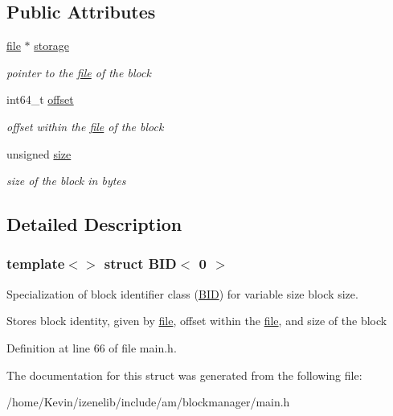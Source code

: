 \subsection*{Public Attributes}
\begin{CompactItemize}
\item 
\hypertarget{structBID_3_010_01_4_b98488cecac14193e6b1505088b2ecee}{
\hyperlink{classfile}{file} $\ast$ \hyperlink{structBID_3_010_01_4_b98488cecac14193e6b1505088b2ecee}{storage}}
\label{structBID_3_010_01_4_b98488cecac14193e6b1505088b2ecee}

\begin{CompactList}\small\item\em pointer to the \hyperlink{classfile}{file} of the block \item\end{CompactList}\item 
\hypertarget{group__mnglayer_gea6d48c5b1d781f69b9fac42bec0b501}{
int64\_\-t \hyperlink{group__mnglayer_gea6d48c5b1d781f69b9fac42bec0b501}{offset}}
\label{group__mnglayer_gea6d48c5b1d781f69b9fac42bec0b501}

\begin{CompactList}\small\item\em offset within the \hyperlink{classfile}{file} of the block \item\end{CompactList}\item 
\hypertarget{group__mnglayer_g4f09efa680216eded682e6fed12d985c}{
unsigned \hyperlink{group__mnglayer_g4f09efa680216eded682e6fed12d985c}{size}}
\label{group__mnglayer_g4f09efa680216eded682e6fed12d985c}

\begin{CompactList}\small\item\em size of the block in bytes \item\end{CompactList}\end{CompactItemize}


\subsection{Detailed Description}
\subsubsection*{template$<$$>$ struct BID$<$ 0 $>$}

Specialization of block identifier class (\hyperlink{structBID}{BID}) for variable size block size. 

Stores block identity, given by \hyperlink{classfile}{file}, offset within the \hyperlink{classfile}{file}, and size of the block 

Definition at line 66 of file main.h.

The documentation for this struct was generated from the following file:\begin{CompactItemize}
\item 
/home/Kevin/izenelib/include/am/blockmanager/main.h\end{CompactItemize}
